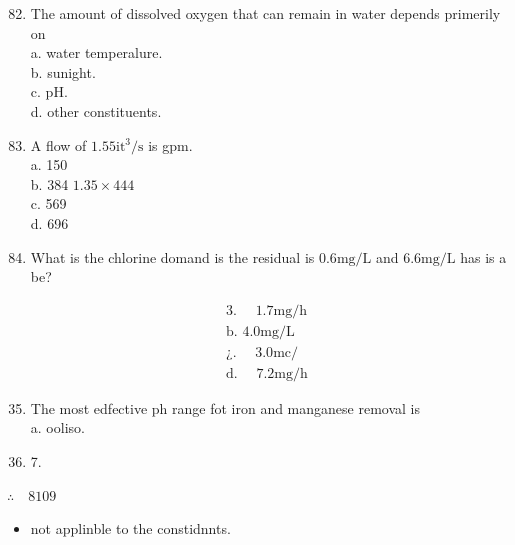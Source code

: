 \documentclass[10pt]{article}
\begin{document}
\begin{enumerate}
  \setcounter{enumi}{81}
  \item The amount of dissolved oxygen that can remain in water depends primerily on\\
a. water temperalure.\\
b. sunight.\\
c. $\mathrm{pH}$.\\
d. other constituents.

  \item A flow of $1.55 \mathrm{it}^{3} / \mathrm{s}$ is gpm.\\
a. 150\\
b. 384 $1.35 \times 444$\\
c. 569\\
d. 696

  \item What is the chlorine domand is the residual is $0.6 \mathrm{mg} / \mathrm{L}$ and $6.6 \mathrm{mg} / \mathrm{L}$ has is a be?

\end{enumerate}

$$
\begin{aligned}
& \text { 3. } \quad 1.7 \mathrm{mg} / \mathrm{h} \\
& \text { b. } 4.0 \mathrm{mg} / \mathrm{L} \\
& \text { ¿. } \quad 3.0 \mathrm{mc} / \\
& \text { d. } \quad 7.2 \mathrm{mg} / \mathrm{h}
\end{aligned}
$$

\begin{enumerate}
  \setcounter{enumi}{34}
  \item The most edfective ph range fot iron and manganese removal is\\
a. ooliso.
  \item 
7.


\end{enumerate}

$\therefore \quad 8109$

\begin{itemize}
  \item not applinble to the constidnnts.
\end{itemize}
\end{document}
